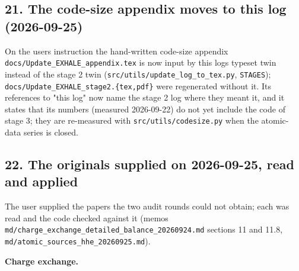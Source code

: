 \documentclass[english,a4paper]{my_memo}
\begin{document}
\subsection{21. The code-size appendix moves to this log (2026-09-25)}\label{21-the-code-size-appendix-moves-to-this-log-2026-09-25}

On the user\textquotesingle s instruction the hand-written code-size appendix
\texttt{docs/Update\_EXHALE\_appendix.tex} is now input by this log\textquotesingle s typeset twin
instead of the stage 2 twin (\texttt{src/utils/update\_log\_to\_tex.py}, \texttt{STAGES});
\texttt{docs/Update\_EXHALE\_stage2.\{tex,pdf\}} were regenerated without it. Its
references to "this log" now name the stage 2 log where they meant it, and
it states that its numbers (measured 2026-09-22) do not yet include the code
of stage 3; they are re-measured with \texttt{src/utils/codesize.py} when the
atomic-data series is closed.

\subsection{22. The originals supplied on 2026-09-25, read and applied}\label{22-the-originals-supplied-on-2026-09-25-read-and-applied}

The user supplied the papers the two audit rounds could not obtain; each was
read and the code checked against it (memos
\texttt{md/charge\_exchange\_detailed\_balance\_20260924.md} sections 11 and 11.8,
\texttt{md/atomic\_sources\_hhe\_20260925.md}).

\textbf{Charge exchange.}
\end{document}
